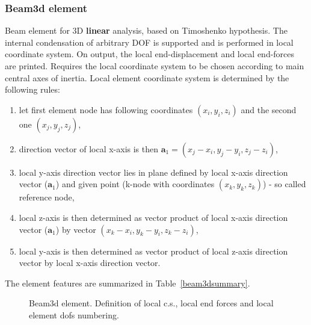 \documentclass[a4paper]{article}
\begin{document}
\subsubsection{Beam3d element}
Beam element for 3D {\bf linear} analysis, based on Timoshenko hypothesis. The internal condensation
of arbitrary DOF is supported and is performed in local coordinate
system. On output, the local end-displacement and local end-forces are
printed. Requires the local coordinate system to be chosen according
to main central axes of inertia. Local element 
coordinate system is determined by the following rules:
\begin{enumerate}
\item let first element node has following coordinates $(x_i, y_i, z_i)$
and the second one $(x_j, y_j, z_j)$,
\item direction vector of local x-axis is then $\mathbf{a}_1 = (x_j-x_i, y_j-y_i, z_j-z_i)$,
\item local y-axis direction vector lies in plane defined by local
x-axis direction vector ($\mathbf{a}_1$) and given
point (k-node with coordinates $(x_k, y_k, z_k)$) - so called reference node,
\item local z-axis is then determined as vector product of local
x-axis direction vector ($\mathbf{a}_1$) by vector $(x_k-x_i, y_k-y_i, z_k-z_i)$,
\item local y-axis is then determined as vector product of local
z-axis direction vector by local x-axis direction vector. 
\end{enumerate}
The element features are summarized in Table~\ref{beam3dsummary}.
\begin{figure}[htb]
 \centering
 \begin{makeimage}
   
 \end{makeimage}
 \caption{Beam3d element. Definition of local c.s., local end forces
 and local element dofs numbering.}
 \label{beam3dfig}
\end{figure}
\end{document}
